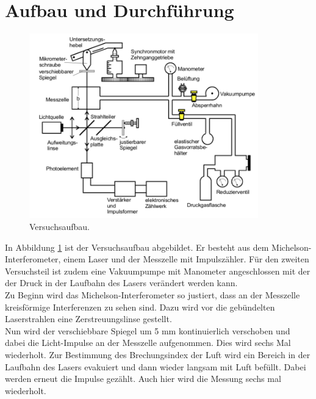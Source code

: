 \section{Aufbau und Durchführung}
\label{sec:Aufbau}

\begin{figure}[H]
    \centering
    \includegraphics[height=8cm]{Aufbau/Aufbau.pdf}
    \caption{Versuchsaufbau.}
    \label{fig:Aufbau}
\end{figure}

In Abbildung \ref{fig:Aufbau} ist der Versuchsaufbau abgebildet. Er besteht aus dem Michelson-Interferometer, einem Laser und der Messzelle mit Impulszähler. Für den zweiten Versuchsteil ist zudem eine Vakuumpumpe mit Manometer angeschlossen mit der der Druck in der Laufbahn des Lasers verändert werden kann. \\
Zu Beginn wird das Michelson-Interferometer so justiert, dass an der Messzelle kreisförmige Interferenzen zu sehen sind. Dazu wird vor die gebündelten Laserstrahlen eine Zerstreuungslinse gestellt. \\
Nun wird der verschiebbare Spiegel um 5 mm kontinuierlich verschoben und dabei die Licht-Impulse an der Messzelle aufgenommen. Dies wird sechs Mal wiederholt. \newline
Zur Bestimmung des Brechungsindex der Luft wird ein Bereich in der Laufbahn des Lasers evakuiert und dann wieder langsam mit Luft befüllt. Dabei werden erneut die Impulse gezählt. Auch hier wird die Messung sechs mal wiederholt.